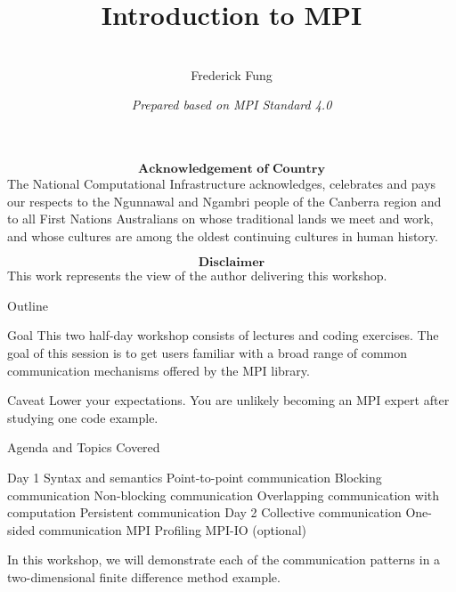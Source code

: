 \documentclass[xcolor=dvipsnames]{beamer}
\title[NCI Training \cc]{Introduction to MPI}%
\author[Fred Fung]{ \\ Frederick Fung}%
\institute[NCI] %
{
  National Computational Infrastructure, Australia
}
\date[2022] %
{ \textit{Prepared based on MPI Standard 4.0}}
\begin{document}
\begin{frame}
  \titlepage
\end{frame}

\begin{frame}
$$\textbf{Acknowledgement of Country}$$
The National Computational Infrastructure acknowledges, celebrates and pays our respects to the Ngunnawal and Ngambri people of the Canberra region and to all First Nations Australians on whose traditional lands we meet and work, and whose cultures are among the oldest continuing cultures in human history.
\end{frame}

\begin{frame}
$$\textbf{Disclaimer}$$
This work represents the view of the author delivering this workshop. 
\end{frame}


\begin{frame}{Outline}
\begin{block}{Goal}
This two half-day workshop consists of lectures and coding exercises. The goal of this session is to get users familiar with a broad range of common communication mechanisms offered by the MPI library.
\end{block}

\pause
\begin{block}{Caveat}
Lower your expectations. You are unlikely becoming an MPI expert after studying one code example.
\end{block}
\end{frame}

\begin{frame}{Agenda and Topics Covered}
\begin{outline}
    \1 Day 1
     \2 Syntax and semantics
    \2 Point-to-point communication
    \3 Blocking communication
    \3 Non-blocking communication
    \3 Overlapping communication with computation
    \3 Persistent communication 
    \1 Day 2
     \2Collective communication
    \2 One-sided communication
    \2 MPI Profiling
    \2 MPI-IO (optional)
\end{outline}
\pause
\begin{block}{}
In this workshop, we will demonstrate each of the communication patterns in a two-dimensional finite difference method example.    
\end{block}
\end{frame}
\end{document}
